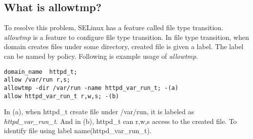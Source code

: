 \documentclass{article}
\begin{document}
\subsection{What is allowtmp?}
To resolve this problem, SELinux has a feature called file type
transition. {\it allowtmp } is a feature to configure file type
transition.
In file type transition, when domain creates files under some directory,
created file is given a label. The label can be named by policy.
Following is example  usage of {\it allowtmp}.
\begin{verbatim}
domain_name  httpd_t;
allow /var/run r,s;
allowtmp -dir /var/run -name httpd_var_run_t; -(a)
allow httpd_var_run_t r,w,s; -(b)
\end{verbatim}
In (a), when httpd\_t create file under /var/run, it is labeled as {\it
httpd\_var\_run\_t}. And in (b), httpd\_t can r,w,s access to the
created file. To identify file using label name(httpd\_var\_run\_t).
\end{document}
